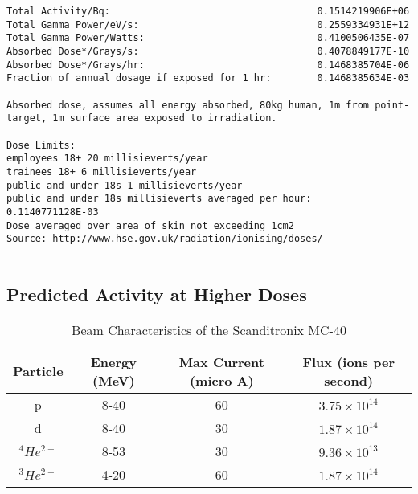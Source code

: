  

\begin{lstlisting}[style=sOutputFile,caption={Mailshot Extract}]
Total Activity/Bq:                                    0.1514219906E+06
Total Gamma Power/eV/s:                               0.2559334931E+12
Total Gamma Power/Watts:                              0.4100506435E-07
Absorbed Dose*/Grays/s:                               0.4078849177E-10
Absorbed Dose*/Grays/hr:                              0.1468385704E-06
Fraction of annual dosage if exposed for 1 hr:        0.1468385634E-03
 
Absorbed dose, assumes all energy absorbed, 80kg human, 1m from point-target, 1m surface area exposed to irradiation.
 
Dose Limits:
employees 18+ 20 millisieverts/year
trainees 18+ 6 millisieverts/year
public and under 18s 1 millisieverts/year
public and under 18s millisieverts averaged per hour:     0.1140771128E-03
Dose averaged over area of skin not exceeding 1cm2
Source: http://www.hse.gov.uk/radiation/ionising/doses/
 
\end{lstlisting}
 



\subsection{Predicted Activity at Higher Doses}




\begin{table}[h]
\begin{center}
\begin{tabular}{c c c c}
\hline
Particle & Energy (MeV) & Max Current (micro A) & Flux (ions per second)\\
\hline
p & 8-40 & 60 & $3.75 \times 10^14$ \\
d & 8-40 & 30 & $1.87 \times 10^14$ \\
${}^4 He^{2+}$ & 8-53 & 30 & $9.36 \times 10^13$ \\
${}^3 He^{2+}$ & 4-20 & 60 & $1.87 \times 10^14$ \\
\end{tabular}
\end{center}
\caption{Beam Characteristics of the Scanditronix MC-40}
\end{table}




